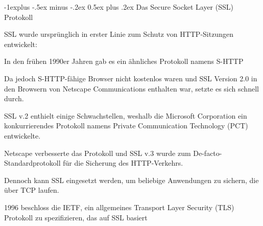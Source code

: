 \documentclass[a4paper]{article}
\makeatletter
\renewcommand{\subsection}{\@startsection{subsection}{2}{0mm}%
 {-1explus -.5ex minus -.2ex}%
 {0.5ex plus .2ex}%
 {\normalfont\normalsize\bfseries}}
\makeatother
\begin{document}
\begin{multicols}{3}
      \subsection{Das Secure Socket Layer (SSL) Protokoll}
      \begin{itemize*}
            \item SSL wurde ursprünglich in erster Linie zum Schutz von HTTP-Sitzungen entwickelt:
            \begin{itemize*}
                  \item In den frühen 1990er Jahren gab es ein ähnliches Protokoll namens S-HTTP
                  \item Da jedoch S-HTTP-fähige Browser nicht kostenlos waren und SSL Version 2.0 in den Browsern von Netscape Communications enthalten war, setzte es sich schnell durch.
                  \item SSL v.2 enthielt einige Schwachstellen, weshalb die Microsoft Corporation ein konkurrierendes Protokoll namens Private Communication Technology (PCT) entwickelte.
                  \item Netscape verbesserte das Protokoll und SSL v.3 wurde zum De-facto-Standardprotokoll für die Sicherung des HTTP-Verkehrs.
                  \item Dennoch kann SSL eingesetzt werden, um beliebige Anwendungen zu sichern, die über TCP laufen.
                  \item 1996 beschloss die IETF, ein allgemeines Transport Layer Security (TLS) Protokoll zu spezifizieren, das auf SSL basiert
            \end{itemize*}
      \end{itemize*}


\end{multicols}
\end{document}
